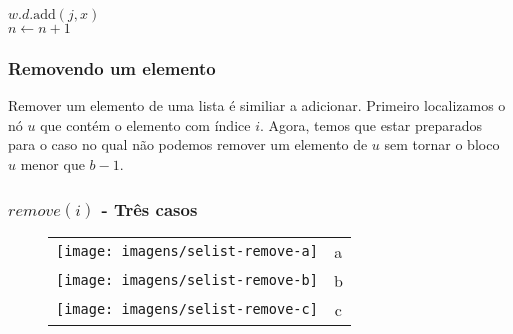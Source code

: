 \documentclass{beamer}
\begin{document}
\begin{frame}[shrink]
\begin{oframed}
\begin{flushleft}
\hspace*{1em} \hspace*{1em} \ensuremath{\ensuremath{\mathit{w}}.\ensuremath{\mathit{d}}.\mathrm{add}(\ensuremath{\mathit{j}}, \ensuremath{\mathit{x}})}\\
\hspace*{1em} \hspace*{1em} \ensuremath{\ensuremath{\mathit{n}} \gets  \ensuremath{\ensuremath{\mathit{n}} + 1}}\\
\end{flushleft}
\end{oframed}
\end{frame}

\begin{frame}
\frametitle{Removendo um elemento}
Remover um elemento de uma lista é similiar a adicionar. Primeiro localizamos o nó $ \ensuremath{\ensuremath{\mathit{u}}}$ que contém o elemento com índice $ \ensuremath{\ensuremath{\mathit{i}}}$. Agora, temos que estar preparados para o caso no qual não podemos remover um elemento de $ \ensuremath{\ensuremath{\mathit{u}}}$ sem tornar o bloco $ \ensuremath{\ensuremath{\mathit{u}}}$ menor que $ \ensuremath{\ensuremath{\ensuremath{\mathit{b}}}}-1$. 
\end{frame}

\begin{frame}[shrink]
\frametitle{$remove(i)$ - Três casos}
\begin{figure}
  \noindent
  \begin{center}
    \begin{tabular}{lc}
      \texttt{[image: imagens/selist-remove-a]}& a\\[4ex]
      \texttt{[image: imagens/selist-remove-b]}& b\\[4ex]
      \texttt{[image: imagens/selist-remove-c]}& c\\
    \end{tabular}
  \end{center}
\end{figure}
\end{frame}
\end{document}

